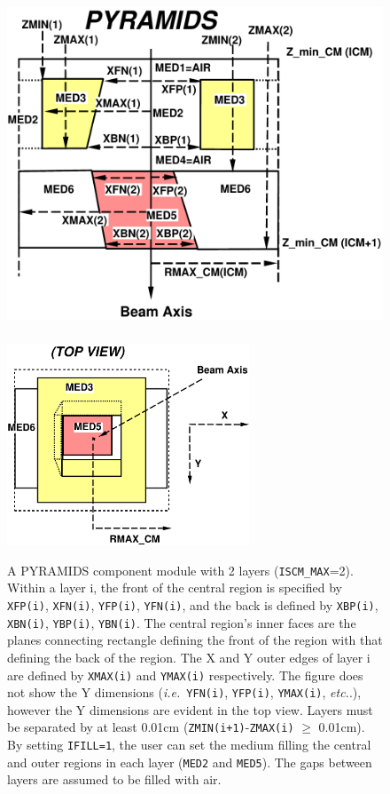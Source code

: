 \documentclass[12pt,twoside]{article}
\newcommand{\ie}{{\em i.e.}}
\newcommand{\etc}{{\em etc.}}
\begin{document}
\begin{figure}[tp]
\leavevmode
\hfill
\includegraphics[height=10.5cm]{figures/pyramidsd}
\vspace{0.1cm}
\includegraphics[height=6.0cm]{figures/pyramidstop}
\caption[PYRAMIDS CM geometry]
{A PYRAMIDS component module with 2 layers ({\tt ISCM\_MAX}=2).  Within a
layer i, the front of the central region is specified by
{\tt XFP(i)}, {\tt XFN(i)}, {\tt YFP(i)}, {\tt YFN(i)}, and the back
is defined by {\tt XBP(i)}, {\tt XBN(i)}, {\tt YBP(i)},
{\tt YBN(i)}.
The central region's inner faces are the planes connecting rectangle
defining the front of the region with that defining the back of the region.
The X and Y outer edges of
layer i are defined by {\tt XMAX(i)} and {\tt YMAX(i)} respectively.
The figure does
not show the Y dimensions (\ie\ {\tt YFN(i)}, {\tt YFP(i)}, {\tt YMAX(i)}, \etc.),
however the Y
dimensions are evident in the top view.  Layers must be separated by at
least 0.01cm ({\tt ZMIN(i+1)}-{\tt ZMAX(i)} $\geq$ 0.01cm).  By setting
{\tt IFILL=1},
the user can set the medium filling the central and outer regions
in each layer ({\tt MED2} and {\tt MED5}).  The gaps
between layers are assumed to be filled with air.}
\label{fig_PYRAMIDSD}
\end{figure}
\end{document}
